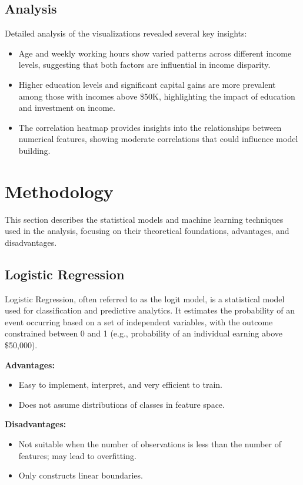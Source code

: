 \documentclass[12pt]{article}
\begin{document}
\subsection{Analysis}
Detailed analysis of the visualizations revealed several key insights:
\begin{itemize}
    \item Age and weekly working hours show varied patterns across different income levels, suggesting that both factors are influential in income disparity.
    \item Higher education levels and significant capital gains are more prevalent among those with incomes above \$50K, highlighting the impact of education and investment on income.
    \item The correlation heatmap provides insights into the relationships between numerical features, showing moderate correlations that could influence model building.
\end{itemize}

\section{Methodology}
This section describes the statistical models and machine learning techniques used in the analysis, focusing on their theoretical foundations, advantages, and disadvantages.

\subsection{Logistic Regression}
Logistic Regression, often referred to as the logit model, is a statistical model used for classification and predictive analytics. It estimates the probability of an event occurring based on a set of independent variables, with the outcome constrained between 0 and 1 (e.g., probability of an individual earning above \$50,000).

\textbf{Advantages:}
\begin{itemize}
    \item Easy to implement, interpret, and very efficient to train.
    \item Does not assume distributions of classes in feature space.
\end{itemize}

\textbf{Disadvantages:}
\begin{itemize}
    \item Not suitable when the number of observations is less than the number of features; may lead to overfitting.
    \item Only constructs linear boundaries.
\end{itemize}
\end{document}
